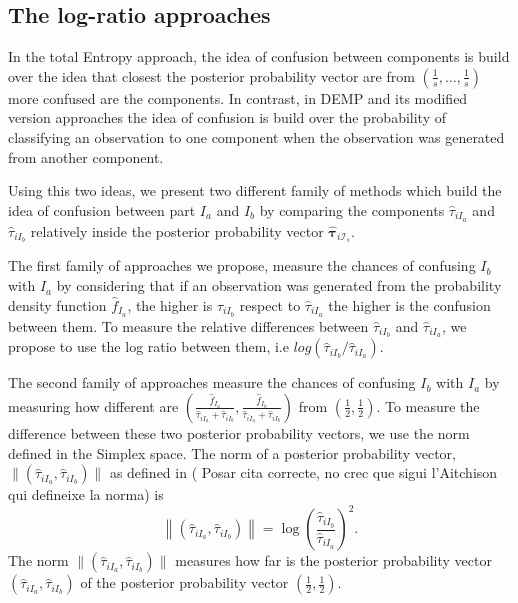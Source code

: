 \documentclass[10pt, a4paper]{article}
\newcommand{\m}[1]{\boldsymbol{#1}}
\begin{document}

\subsection*{The log-ratio approaches}

In the total Entropy approach, the idea of confusion between components is build over the idea that closest the posterior probability vector are from $(\frac{1}{s}, \dots, \frac{1}{s})$ more confused are the components. In contrast, in DEMP and its modified version approaches the idea of confusion is build over the probability of classifying an observation to one component when the observation was generated from another component.

Using this two ideas, we present two different family of methods which build the idea of confusion between part $I_a$ and $I_b$ by comparing the components $\hat{\tau}_{iI_a}$ and $\hat{\tau}_{iI_b}$ relatively inside the posterior probability vector $\hat{\m \tau}_{i \mathcal{I}_s}$. 

The first family of approaches we propose, measure the chances of confusing $I_b$ with $I_a$ by considering that if an observation was generated from the probability density function $\hat{f}_{I_a}$, the higher is $\hat{\tau}_{iI_b}$ respect to $\hat{\tau}_{iI_a}$ the higher is the confusion between them. To measure the relative differences between  $\hat{\tau}_{iI_b}$ and $\hat{\tau}_{iI_a}$, we propose to use the log ratio between them, i.e $log( \hat{\tau}_{iI_b}/\hat{\tau}_{iI_a})$.

The second family of approaches measure the chances of confusing $I_b$ with $I_a$  by measuring how different are $(\frac{\hat{f}_{I_a}}{\hat{\tau}_{iI_a} + \hat{\tau}_{iI_b}}, \frac{\hat{f}_{I_b}}{\hat{\tau}_{iI_a} + \hat{\tau}_{iI_b}})$ from $(\frac{1}{2}, \frac{1}{2})$. To measure the difference between these two posterior probability vectors, we use the norm defined in the Simplex space. The norm of a posterior probability vector, $\| (\hat{\tau}_{iI_a}, \hat{\tau}_{iI_b}) \|$  as defined in ({\color{red} Posar cita correcte, no crec que sigui l'Aitchison qui defineixe la norma}) \citep{aitchison1986statistical} is
\[
\left\| (\hat{\tau}_{iI_a}, \hat{\tau}_{iI_b}) \right\| = \log (\frac{ \hat{\tau}_{iI_b} }{ \hat{\tau}_{iI_a} })^2.
\]
The norm $\| (\hat{\tau}_{iI_a}, \hat{\tau}_{iI_b}) \|$ measures how far is the posterior probability vector $(\hat{\tau}_{iI_a}, \hat{\tau}_{iI_b})$ of the posterior probability vector $(\frac{1}{2}, \frac{1}{2})$.
\end{document}
